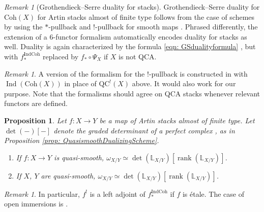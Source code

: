 \documentclass{amsart}
\newtheorem{proposition}[theorem]{Proposition}
\theoremstyle{definition}
\theoremstyle{remark}
\newtheorem{remark}[theorem]{Remark}
\numberwithin{equation}{section}
\DeclareMathOperator{\Ind}{Ind}
\DeclareMathOperator{\rank}{rank}
\newcommand{\bb}{\mathbb}
\newcommand{\IndCoh}{\mathrm{IndCoh}}
\newcommand{\Coh}{\mathrm{Coh}}
\begin{document}
\begin{remark}[Grothendieck--Serre duality for stacks]
Grothendieck--Serre duality for $\Coh(X)$ for Artin stacks almost of finite type follows from the case of schemes by using the $*$-pullback and $!$-pullback for smooth maps \cite[(4.4)]{DrinfeldGaitsgory}. Phrased differently, the extension of a 6-functor formalism automatically encodes duality for stacks as well. Duality is again characterized by the formula \eqref{eqn: GSdualityformula} \cite[Proposition 4.4.4]{DrinfeldGaitsgory}, but with $f^{\IndCoh}_*$ replaced by $f_*\circ \Psi_X$ if $X$ is not QCA. 
\end{remark}

\begin{remark}
A version of the formalism for the $!$-pullback is constructed in \cite[Theorem 9.39]{ZhuTame} with $\Ind(\Coh(X))$ in place of $\mathrm{QC}^!(X)$ above. It would also work for our purpose. Note that the formalisms should agree on QCA stacks whenever relevant functors are defined. 
\end{remark}

\begin{proposition}\label{prop: QuasismoothDualizingStack}
Let $f\colon X\to Y$ be a map of Artin stacks almost of finite type. Let $\det(-)[-]$ denote the graded determinant of a perfect complex \cite{Heleodoro}, \cite[Appendix B]{HalpernLeistner} as in Proposition \ref{prop: QuasismoothDualizingScheme}.
\begin{enumerate}
    \item If $f\colon X\to Y$ is quasi-smooth, $\omega_{X/Y}\simeq \det (\bb L_{X/Y})[\rank(\bb L_{X/Y})]$. 
    \item If $X$, $Y$ are quasi-smooth, $\omega_{X/Y} \simeq \det (\bb L_{X/Y})[\rank(\bb L_{X/Y})]$.  
\end{enumerate}
\end{proposition}

\begin{remark}
In particular, $f^!$ is a left adjoint of $f_*^{\IndCoh}$ if $f$ is \'etale. The case of open immersions is \cite[\S 3.5.5]{GRII}. 
\end{remark}
\end{document}
